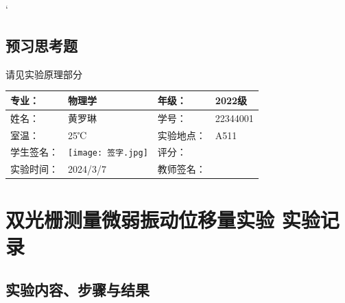 \documentclass[dvipsnames, svgnames,a4paper,11pt]{article}
\begin{document}
	`
	
	\subsection{预习思考题}
	请见实验原理部分

	
	
	
	
	\clearpage
	
	\begin{table}
		\renewcommand\arraystretch{1.7}
		\centering
		\begin{tabularx}{\textwidth}{|X|X|X|X|}
			\hline
			专业： & 物理学 & 年级： & 2022级 \\
			\hline
			姓名： & 黄罗琳 & 学号： & 22344001\\
			\hline
			室温： &  25℃& 实验地点： & A511 \\
			\hline
			学生签名： & \texttt{[image: 签字.jpg]} &
    评分： & \\
			\hline
			实验时间：& 2024/3/7 & 教师签名：&\\
			\hline
		\end{tabularx}
	\end{table}
	
	\section{双光栅测量微弱振动位移量实验 \quad\heiti 实验记录}
	
	\subsection{实验内容、步骤与结果}
	
\end{document}
